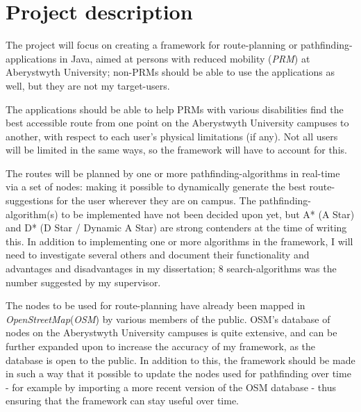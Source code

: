 \documentclass[11pt,fleqn,twoside]{article}
\begin{document}

\mmp

\setcounter{tocdepth}{3} %


\section{Project description}

The project will focus on creating a framework for route-planning or pathfinding-applications in Java, aimed at persons with reduced mobility (\textit{PRM}) at Aberystwyth University; non-PRMs should be able to use the applications as well, but they are not my target-users.

The applications should be able to help PRMs with various disabilities find the best accessible route from one point on the Aberystwyth University campuses to another, with respect to each user's physical limitations (if any). Not all users will be limited in the same ways, so the framework will have to account for this.

The routes will be planned by one or more pathfinding-algorithms in real-time via a set of nodes: making it possible to dynamically generate the best route-suggestions for the user wherever they are on campus. The pathfinding-algorithm(s) to be implemented have not been decided upon yet, but A* (A Star) and D* (D Star / Dynamic A Star) are strong contenders at the time of writing this. In addition to implementing one or more algorithms in the framework, I will need to investigate several others and document their functionality and advantages and disadvantages in my dissertation; 8 search-algorithms was the number suggested by my supervisor.

The nodes to be used for route-planning have already been mapped in \textit{OpenStreetMap}(\textit{OSM}) \cite{OSM} by various members of the public. OSM's database of nodes on the Aberystwyth University campuses is quite extensive, and can be further expanded upon to increase the accuracy of my framework, as the database is open to the public. In addition to this, the framework should be made in such a way that it possible to update the nodes used for pathfinding over time - for example by importing a more recent version of the OSM database - thus ensuring that the framework can stay useful over time.
\end{document}
